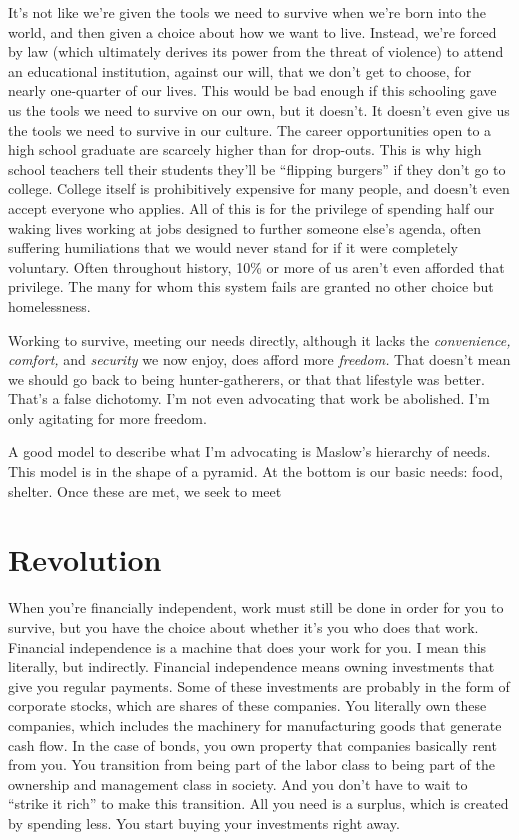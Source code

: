 It's not like we're given the tools we need to survive when we're born into the world, and then given a choice about how we want to live. Instead, we're forced by law (which ultimately derives its power from the threat of violence) to attend an educational institution, against our will, that we don't get to choose, for nearly one-quarter of our lives. This would be bad enough if this schooling gave us the tools we need to survive on our own, but it doesn't. It doesn't even give us the tools we need to survive in our culture. The career opportunities open to a high school graduate are scarcely higher than for drop-outs. This is why high school teachers tell their students they'll be ``flipping burgers'' if they don't go to college. College itself is prohibitively expensive for many people, and doesn't even accept everyone who applies. All of this is for the privilege of spending half our waking lives working at jobs designed to further someone else's agenda, often suffering humiliations that we would never stand for if it were completely voluntary. Often throughout history, 10\% or more of us aren't even afforded that privilege. The many for whom this system fails are granted no other choice but homelessness.

Working to survive, meeting our needs directly, although it lacks the \emph{convenience, comfort,} and \emph{security} we now enjoy, does afford more \emph{freedom.} That doesn't mean we should go back to being hunter-gatherers, or that that lifestyle was better. That's a false dichotomy. I'm not even advocating that work be abolished. I'm only agitating for more freedom.

A good model to describe what I'm advocating is Maslow's hierarchy of needs. This model is in the shape of a pyramid. At the bottom is our basic needs: food, shelter. Once these are met, we seek to meet

\section{Revolution}
When you're financially independent, work must still be done in order for you to survive, but you have the choice about whether it's you who does that work. Financial independence is a machine that does your work for you. I mean this literally, but indirectly. Financial independence means owning investments that give you regular payments. Some of these investments are probably in the form of corporate stocks, which are shares of these companies. You literally own these companies, which includes the machinery for manufacturing goods that generate cash flow. In the case of bonds, you own property that companies basically rent from you. You transition from being part of the labor class to being part of the ownership and management class in society. And you don't have to wait to ``strike it rich'' to make this transition. All you need is a surplus, which is created by spending less. You start buying your investments right away.

